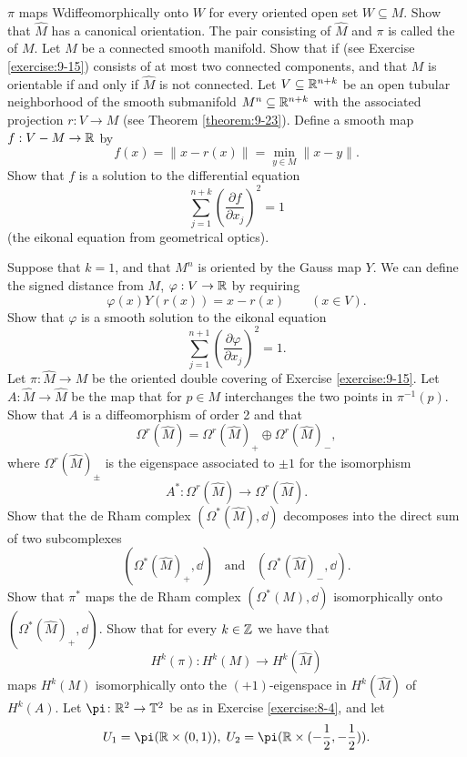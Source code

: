 \begin{enumerate}[\theexercise.1]
    $\pi$ maps Wdiffeomorphically onto $W$ for every oriented open set $W\subseteq M$.
    Show that $\hat M$ has a canonical orientation. The pair consisting of $\hat M$ and
    $\pi$ is called the  of $M$.
  \NewItem Let $M$ be a connected smooth manifold. Show that if (see Exercise \ref{exercise:9-15})
    consists of at most two connected components, and that $M$ is orientable if and only if $\hat M$ is not connected.
  \NewItem Let $V\subseteq{\ensuremath{\mathbb{R}}}^{n+k}$ be an open tubular neighborhood of the smooth submanifold
    $M^n\subseteq {\ensuremath{\mathbb{R}}}^{n+k}$ with the associated projection $r:V\to M$ (see Theorem \ref{theorem:9-23}).
    Define a smooth map $f:V-M\to {\ensuremath{\mathbb{R}}}$ by
    \[
      f(x) = \|x-r(x)\| = \min_{y\in M}\|x-y\|.
    \]
    Show that $f$ is a solution to the differential equation
    \[
      \sum_{j=1}^{n+k }{\left(\frac{\partial f }{\partial x_j }\right)^2} = 1
    \]
    (the eikonal equation from geometrical optics).\par
    Suppose that $k = 1$, and that $M^n$ is oriented by the Gauss map $Y$. We can define the signed distance
    from $M$, $\varphi: V\to {\ensuremath{\mathbb{R}}}$ by requiring
    \[
      \varphi(x)Y(r(x)) = x-r(x)\qquad (x\in V).
    \]
    Show that $\varphi$ is a smooth solution to the eikonal equation
    \[
      \sum_{j=1}^{n+1}{\left(\frac{\partial \varphi }{\partial x_j }\right)^2} = 1.
    \]
  \NewItem Let $\pi:\hat{M}\to M$ be the oriented double covering of Exercise \ref{exercise:9-15}.
    Let $A:\hat M\to \hat M$ be the map that for $p\in M$ interchanges the two points in $\pi^{-1}(p)$. Show that $A$
    is a diffeomorphism of order 2 and that
    \[
      \Omega^r(\hat M) = \Omega^r(\hat M)_+\oplus \Omega^r(\hat M)_-,
    \]
    where $\Omega^r(\hat M)_{\pm}$ is the eigenspace associated to $\pm 1$ for the isomorphism
    \[
      A^*:\Omega^r(\hat M)\to\Omega^r(\hat M).
    \]
    Show that the de Rham complex $(\Omega^*(\hat M), \dd)$ decomposes into the direct sum of two subcomplexes
    \[
      (\Omega^*(\hat M)_+, \dd) \enspace\text{ and }\enspace (\Omega^*(\hat M)_-, \dd).
    \]
    Show that $\pi^*$ maps the de Rham complex $(\Omega^*(M), \dd)$ isomorphically onto $(\Omega^*(\hat M)_+, \dd)$.
    Show that for every $k\in{\ensuremath{\mathbb{Z}}}$ we have that
    \[
      H^k(\pi):H^k(M)\to H^k(\hat M)
    \]
    maps $H^k(M)$ isomorphically onto the $(+1)$-eigenspace in $H^k(\hat M)$ of $H^k(A)$.
  \newchap[10]
  \NewItem Let $\pi\colon  {\B{R}}^{2} \ra  {\B{T}}^{2}$ be as in Exercise \ref{exercise:8-4}, and let
    \[
      {U}_{1} = \pi ( {\B{R} \times  ( {0,1}) }),\;{U}_{2} = \pi ( {\B{R} \times  ( {-\frac{1}{2},- \frac{1}{2}}) }).
\]
\end{enumerate}
